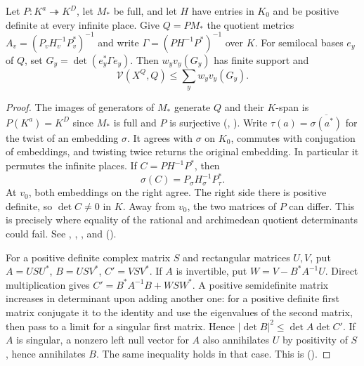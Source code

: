 \begin{lemma}\label{lem:P5-base}
Let $P:K^a\twoheadrightarrow K^D$, let $M_*$ be full, and let $H$ have entries
in $K_0$ and be positive definite at every infinite place. Give $Q=P M_*$
the quotient metrics $A_v=(P_v H_v^{-1}P_v^*)^{-1}$ and write
$\Gamma=(PH^{-1}P^*)^{-1}$ over $K$. For semilocal bases $e_y$ of $Q$, set
$G_y=\det(e_y^*\Gamma e_y)$. Then $w_yv_y(G_y)$ has finite support and
\[
                       \mathcal V(X^Q,Q)\le\sum_y w_y v_y(G_y).
\]
\end{lemma}
\begin{proof}
The images of generators of $M_*$ generate $Q$ and their $K$-span
is $P(K^a)=K^D$ since $M_*$ is full and $P$ is surjective
(, ). Write
$\tau(a)=\overline{\sigma(a^*)}$ for the twist of an embedding $\sigma$.
It agrees with $\sigma$ on $K_0$, commutes with conjugation of embeddings,
and twisting twice returns the original embedding. In particular it
permutes the infinite places. If $C=PH^{-1}P^*$, then
\[
          \sigma(C)=P_\sigma H_\sigma^{-1}P_\tau^*.
\]
At $v_0$, both embeddings on the right agree. The right side there is
positive definite, so $\det C\ne0$ in $K$. Away from $v_0$, the two
matrices of $P$ can differ. This is precisely where equality of the rational
and archimedean quotient determinants could fail.
See , , , 
and  ().

For a positive definite complex matrix $S$ and rectangular matrices $U,V$,
put $A=USU^*$, $B=USV^*$, $C'=VSV^*$. If $A$ is invertible, put
$W=V-B^*A^{-1}U$. Direct multiplication gives
$C'=B^*A^{-1}B+WSW^*$. A positive semidefinite matrix increases in
determinant upon adding another one: for a positive definite first matrix
conjugate it to the identity and use the eigenvalues of the second matrix,
then pass to a limit for a singular first matrix. Hence
$|\det B|^2\le\det A\det C'$. If $A$ is singular, a nonzero left null vector
for $A$ also annihilates $U$ by positivity of $S$, hence annihilates $B$.
The same inequality holds in that case. This is
 ().


\end{proof}
